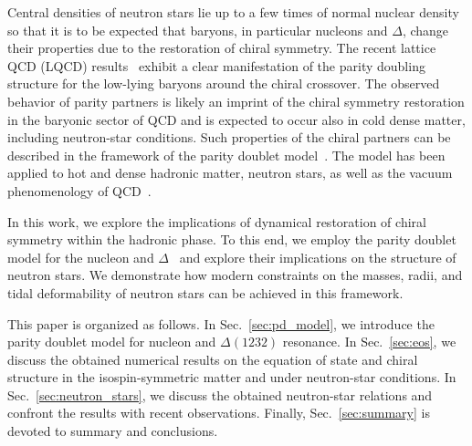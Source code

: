 \documentclass[preprint,showkeys,lengthcheck,nofootinbib,twocolumn,notitlepage,floatfix,superscriptaddress]{revtex4-1}
\begin{document}
Central densities of neutron stars lie up to a few times of normal nuclear density so that it is to be expected that baryons, in particular nucleons and $\Delta$, change their properties due to the restoration of chiral symmetry. The recent lattice QCD (LQCD) results~\cite{Aarts:2015mma, Aarts:2017rrl, Aarts:2018glk} exhibit a clear manifestation of the parity doubling structure for the low-lying baryons around the chiral crossover. The observed behavior of parity partners is likely an imprint of the chiral symmetry restoration in the baryonic sector of QCD and is expected to occur also in cold dense matter, including neutron-star conditions. Such properties of the chiral partners can be described in the framework of the parity doublet model~\cite{Detar:1988kn, Jido:1999hd, Jido:2001nt}. The model has been applied to hot and dense hadronic matter, neutron stars, as well as the vacuum phenomenology of QCD~\cite{Dexheimer:2007tn, Gallas:2009qp, Paeng:2011hy, Sasaki:2011ff, Gallas:2011qp, Zschiesche:2006zj, Benic:2015pia, Marczenko:2017huu, Marczenko:2018jui, Marczenko:2019trv, Marczenko:2020wlc, Marczenko:2020jma, Marczenko:2020omo, Marczenko:2021uaj, Mukherjee:2017jzi, Mukherjee:2016nhb, Dexheimer:2012eu, Steinheimer:2011ea, Weyrich:2015hha, Sasaki:2010bp, Yamazaki:2018stk, Yamazaki:2019tuo, Ishikawa:2018yey, Steinheimer:2010ib, Giacosa:2011qd, Motohiro:2015taa, Minamikawa:2020jfj, Minamikawa:2021fln}.

In this work, we explore the implications of dynamical restoration of chiral symmetry within the hadronic phase. To this end, we employ the parity doublet model for the nucleon and $\Delta$~\cite{Jido:1999hd, Takeda:2017mrm} and explore their implications on the structure of neutron stars. We demonstrate how modern constraints on the masses, radii, and tidal deformability of neutron stars can be achieved in this framework.

This paper is organized as follows. In Sec.~\ref{sec:pd_model}, we introduce the parity doublet model for nucleon and $\Delta(1232)$ resonance. In Sec.~\ref{sec:eos}, we discuss the obtained numerical results on the equation of state and chiral structure in the isospin-symmetric matter and under neutron-star conditions. In Sec.~\ref{sec:neutron_stars}, we discuss the obtained neutron-star relations and confront the results with recent observations. Finally, Sec.~\ref{sec:summary} is devoted to summary and conclusions.

\end{document}
